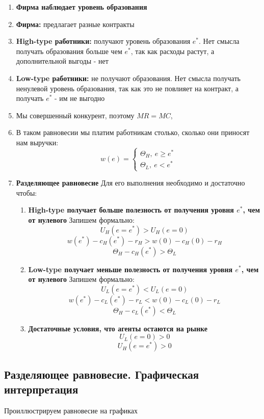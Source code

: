 \begin{enumerate}
    \item \textbf{Фирма наблюдает уровень образования}
    \item \textbf{Фирма:} предлагает разные контракты
    \item \textbf{High-type работники:} получают уровень образования $e^*$. Нет смысла получать образования больше чем $e^*$, так как расходы растут, а дополнительной выгоды - нет
    \item \textbf{Low-type работники:} не получают образования. Нет смысла получать ненулевой уровень образования, так как это не повлияет на контракт, а получать $e^*$ - им не выгодно
    \item Мы совершенный конкурент, поэтому $MR=MC$,
    \item В таком равновесии мы платим работникам столько, сколько они приносят нам выручки: $$w(e)=\begin{cases}
        \Theta_H, \ e \geq e^* \\
        \Theta_L, \ e < e^*
    \end{cases}$$
    \item \textbf{Разделяющее равновесие} Для его выполнения необходимо и достаточно чтобы:\begin{enumerate}
        \item \textbf{High-type получает больше полезность от получения уровня $e^*$, чем от нулевого} Запишем формально:$$U_H(e=e^*)>U_H(e=0)$$
        $$w(e^*)-c_H(e^*)-r_H>w(0)-c_H(0)-r_H$$
        $$\Theta_H-c_H(e^*)>\Theta_L$$
        \item \textbf{Low-type получает меньше полезность от получения уровня $e^*$, чем от нулевого} Запишем формально:$$U_L(e=e^*)<U_L(e=0)$$
        $$w(e^*)-c_L(e^*)-r_L<w(0)-c_L(0)-r_L$$
        $$\Theta_H-c_L(e^*)<\Theta_L$$
        \item \textbf{Достаточные условия, что агенты остаются на рынке} $$U_L(e=0)>0$$
        $$U_H(e=e^*)>0$$
    \end{enumerate}
\end{enumerate}

\subsection{Разделяющее равновесие. Графическая интерпретация}

\indent\setlength{\parindent}{1em}Проиллюстрируем равновесие на графиках

